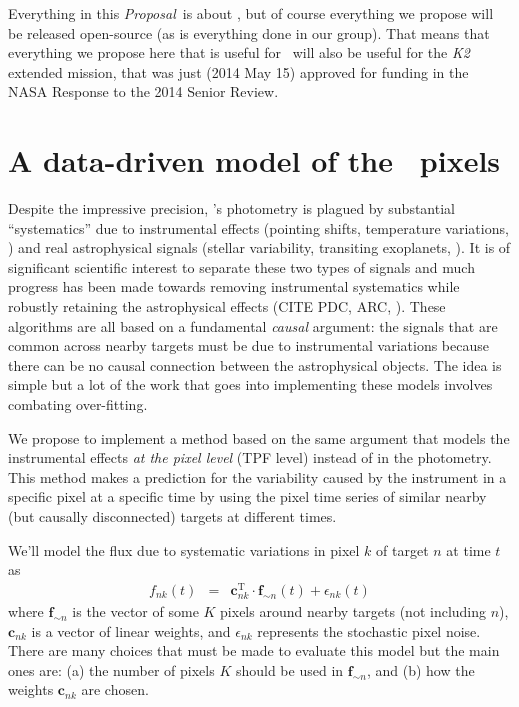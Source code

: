 \documentclass[letterpaper,12pt,preprint]{hack_aastex}
\newcommand{\bvec}[1]{{\ensuremath{{\boldsymbol{#1}}}}}
\newcommand{\documentname}{\textsl{Proposal}}
\begin{document}
Everything in this \documentname\ is about \Kepler, but of course everything we
propose will be released open-source (as is everything done in our group).
That means that everything we propose here that is useful for \Kepler\ will
also be useful for the \textsl{K2} extended mission, that was just (2014 May 15)
approved for funding in the NASA Response to the 2014 Senior Review.

\section{A data-driven model of the \Kepler\ pixels}

Despite the impressive precision, \Kepler's photometry is plagued by
substantial ``systematics'' due to instrumental effects (pointing shifts,
temperature variations, \etc) and real astrophysical signals (stellar
variability, transiting exoplanets, \etc).
It is of significant scientific interest to separate these two types of
signals and much progress has been made towards removing instrumental
systematics while robustly retaining the astrophysical effects (CITE PDC, ARC,
\etc).
These algorithms are all based on a fundamental \emph{causal} argument: the
signals that are common across nearby targets must be due to instrumental
variations because there can be no causal connection between the astrophysical
objects.
The idea is simple but a lot of the work that goes into implementing these
models involves combating over-fitting.

We propose to implement a method based on the same argument that models the
instrumental effects \emph{at the pixel level} (TPF level)
instead of in the photometry.
This method makes a prediction for the variability caused by the instrument in
a specific pixel at a specific time by using the pixel time series of similar
nearby (but causally disconnected) targets at different times.

We'll model the flux due to systematic variations in pixel $k$ of target
$n$ at time $t$ as
\begin{eqnarray}
f_{nk}(t) &=& \bvec{c}_{nk}^\mathrm{T}\cdot\bvec{f}_{\sim n}(t)
              + \epsilon_{nk}(t)
\end{eqnarray}
where $\bvec{f}_{\sim n}$ is the vector of some $K$ pixels around nearby
targets (not including $n$), $\bvec{c}_{nk}$ is a vector of linear weights,
and $\epsilon_{nk}$ represents the stochastic pixel noise.
There are many choices that must be made to evaluate this model but the main
ones are: (a) the number of pixels $K$ should be used in $\bvec{f}_{\sim n}$,
and (b) how the weights $\bvec{c}_{nk}$ are chosen.
\end{document}
